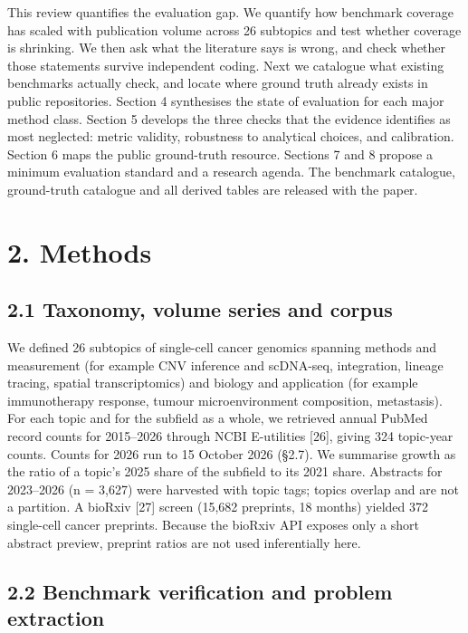 \documentclass[11pt]{article}
\begin{document}
This review quantifies the evaluation gap. We quantify how benchmark
coverage has scaled with publication volume across 26 subtopics and test
whether coverage is shrinking. We then ask what the literature says is
wrong, and check whether those statements survive independent coding.
Next we catalogue what existing benchmarks actually check, and locate
where ground truth already exists in public repositories. Section 4
synthesises the state of evaluation for each major method class. Section
5 develops the three checks that the evidence identifies as most
neglected: metric validity, robustness to analytical choices, and
calibration. Section 6 maps the public ground-truth resource. Sections 7
and 8 propose a minimum evaluation standard and a research agenda. The
benchmark catalogue, ground-truth catalogue and all derived tables are
released with the paper.

\section{2. Methods}\label{methods}

\subsection{2.1 Taxonomy, volume series and corpus}\label{taxonomy-volume-series-and-corpus}

We defined 26 subtopics of single-cell cancer genomics spanning methods
and measurement (for example CNV inference and scDNA-seq, integration,
lineage tracing, spatial transcriptomics) and biology and application
(for example immunotherapy response, tumour microenvironment
composition, metastasis). For each topic and for the subfield as a
whole, we retrieved annual PubMed record counts for 2015--2026 through
NCBI E-utilities {[}26{]}, giving 324 topic-year counts. Counts for 2026
run to 15 October 2026 (§2.7). We summarise growth as the ratio of a
topic's 2025 share of the subfield to its 2021 share. Abstracts for
2023--2026 (n = 3,627) were harvested with topic tags; topics overlap
and are not a partition. A bioRxiv {[}27{]} screen (15,682 preprints, 18
months) yielded 372 single-cell cancer preprints. Because the bioRxiv
API exposes only a short abstract preview, preprint ratios are not used
inferentially here.

\subsection{2.2 Benchmark verification and problem extraction}\label{benchmark-verification-and-problem-extraction}
\end{document}
